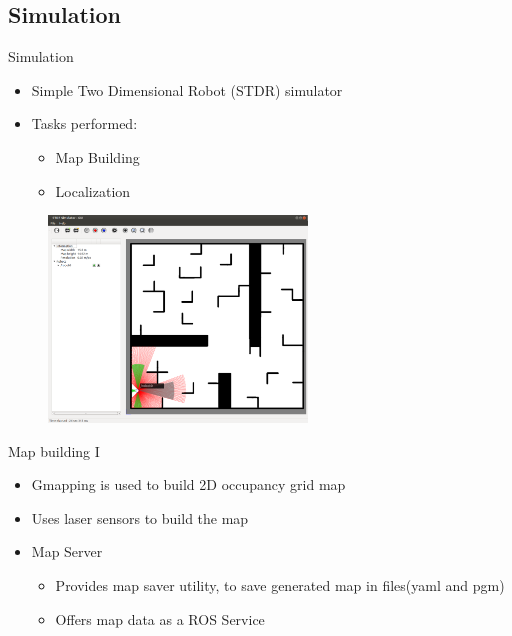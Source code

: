 
\subsection{Simulation}

\begin{frame}{Simulation}
    \begin{itemize}
        \item Simple Two Dimensional Robot (STDR) simulator	
        \item Tasks  performed:
        \begin{itemize}
            \item Map Building
            \item Localization
        \end{itemize}
    \end{itemize}
    
    \centering
    \includegraphics[width=90mm,height=55mm]{gfx/stdr_simulator}
    
\end{frame}
\begin{frame}{Map building I}
    \begin{itemize}
        \item Gmapping is used to build 2D occupancy grid map 
		\item Uses laser sensors to build the map
        \item Map Server
        \begin{itemize}
            \item Provides map saver utility, to save generated map in files(yaml and pgm)
            \item Offers map data as a ROS Service
        \end{itemize}
        
    \end{itemize}
\end{frame}
